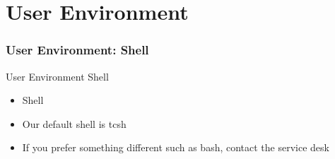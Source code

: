 \part{User Environment}
\frame{\partpage}

{
\section{User Environment: Shell}
%
\begin{frame}{User Environment}
\text Shell
\begin{itemize}
\item Shell
\item Our default shell is tcsh
\item If you prefer something different such as bash, contact the service desk
\end{itemize}
\end{frame}
}

